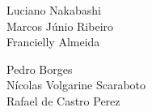 \documentclass[12pt,a4paper]{article}
\begin{document}
\begin{multicols}{2}

\begin{flushleft}
Luciano Nakabashi \\        
Marcos Júnio Ribeiro \\
Francielly Almeida  \\
\end{flushleft}

\begin{flushright}
Pedro Borges \\
Nícolas Volgarine Scaraboto \\
Rafael de Castro Perez \\
\end{flushright}

\end{multicols}

\vspace{0.2cm}
















\end{document}
